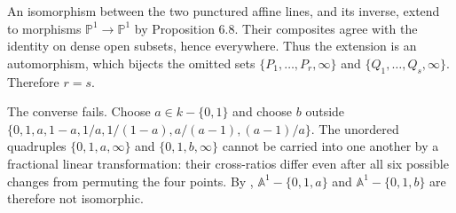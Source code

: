 An isomorphism between the two punctured affine lines, and its inverse, extend to morphisms $\mathbb{P}^1\to\mathbb{P}^1$ by Proposition 6.8. Their composites agree with the identity on dense open subsets, hence everywhere. Thus the extension is an automorphism, which bijects the omitted sets $\{P_1,\ldots,P_r,\infty\}$ and $\{Q_1,\ldots,Q_s,\infty\}$. Therefore $r=s$.

The converse fails. Choose $a\in k-\{0,1\}$ and choose $b$ outside $\{0,1,a,1-a,1/a,1/(1-a),a/(a-1),(a-1)/a\}$. The unordered quadruples $\{0,1,a,\infty\}$ and $\{0,1,b,\infty\}$ cannot be carried into one another by a fractional linear transformation: their cross-ratios differ even after all six possible changes from permuting the four points. By , $\mathbb{A}^1-\{0,1,a\}$ and $\mathbb{A}^1-\{0,1,b\}$ are therefore not isomorphic.
